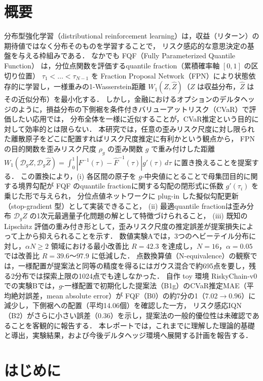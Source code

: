 \documentclass[a4paper,10pt]{jsarticle}
\theoremstyle{definition}
\newcommand{\Wone}{W_1}
\newcommand{\Finv}{F^{-1}}
\newcommand{\Fhinv}{\hat{F}^{-1}}
\newcommand{\dist}{\mathcal{D}_g}
\begin{document}
\section*{概要}
分布型強化学習（distributional reinforcement learning）は，収益（リターン）の期待値ではなく分布そのものを学習することで，
リスク感応的な意思決定の基盤を与える枠組みである．
なかでも FQF（Fully Parameterized Quantile Function）\cite{yang2019fqf} は，分位点関数を評価するquantile fraction（累積確率軸 $[0, 1]$ の区切り位置）
$\tau_1<\dots<\tau_{N-1}$ を Fraction Proposal Network（FPN）により状態依存的に学習し，一様重みの1-Wasserstein距離 $\Wone(Z,\hat{Z})$（$Z$ は収益分布，$\hat{Z}$ はその近似分布）を最小化する．
しかし，金融におけるオプションのデルタヘッジのように，損益分布の下側裾を条件付きバリューアットリスク（CVaR）で評価したい応用では，
分布全体を一様に近似することが，CVaR推定という目的に対して効率的とは限らない．
本研究では，任意の歪みリスク尺度に対し限られた離散原子をどこに配置すればリスク尺度推定に有利かという観点から，
FPNの目的関数を歪みリスク尺度 $\rho_g$ の歪み関数 $g$ で重み付けした距離
$\Wone(\dist Z,\dist\hat{Z})=\int_0^1|\Finv(\tau)-\Fhinv(\tau)|g'(\tau)\,d\tau$ に置き換えることを提案する．
この置換により，(i) 各区間の原子を $g$-中央値にとることで母集団目的に関する境界勾配が FQF のquantile fractionに関する勾配の閉形式に係数 $g'(\tau_i)$ を乗じた形で与えられ，
分位点値ネットワークに plug-in した擬似勾配更新（stop-gradient 型）として実装できること，
(ii) 最適quantile fractionは歪み分布 $\dist Z$ の1次元最適量子化問題の解として特徴づけられること，
(iii) 既知の Lipschitz 評価の重み付き形として，歪みリスク尺度の推定誤差が提案損失によって上から抑えられることを示す．
数値実験Aでは，3つのヘビーテイル分布に対し，$\alpha N\ge2$ 領域における最小改善比 $R=42.3$ を達成し，$N=16$，$ \alpha=0.05$ では改善比 $R=39.6$〜$97.9$ に低減した．
点数換算値（N-equivalence）の観察では，一様配置が提案法と同等の精度を得るにはガウス混合で約695点を要し，残る2分布では探索上限の1024点でも達しなかった．
自作 toy 環境 RiskyChain-v0 での実験Bでは，$g$-一様配置で初期化した提案法（B1g）のCVaR推定MAE（平均絶対誤差，mean absolute error）が
FQF（B0）の約7分の1（$7.02\to0.96$）に減少し，下側裾への配置（平均14.06個）を確認した一方，
リスク感応IQN（B2）がさらに小さい誤差（$0.36$）を示し，提案法の一般的優位性は未確認であることを客観的に報告する．
本レポートでは，これまでに理解した理論的基礎と導出，実験結果，および今後デルタヘッジ環境へ展開する計画を報告する．
\section{はじめに}
\label{sec:intro}
\end{document}
